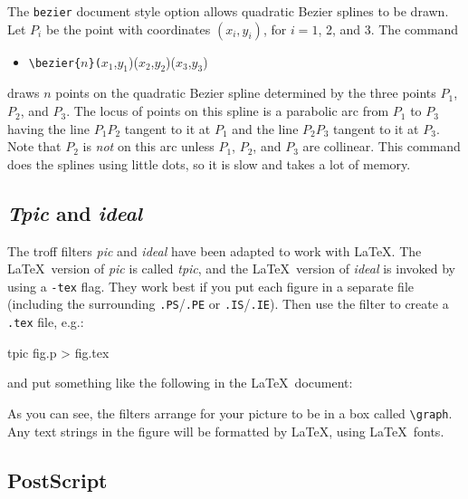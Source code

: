 The \verb|bezier| document style option allows quadratic Bezier
splines to be drawn.
Let $P_{i}$ be the point
with coordinates $(x_{i},y_{i})$, for $i=1$, 2, and 3.  The command
\begin{itemize} \tt
\item[]
\verb|\bezier{|$n$\verb|}(|$x_{1}$,$y_{1}$)($x_{2}$,$y_{2}$)($x_{3}$,$y_{3}$)
\end{itemize}
draws $n$ points on the quadratic Bezier spline determined by the three
points $P_{1}$, $P_{2}$, and $P_{3}$.  The locus of points on this
spline is a parabolic arc from $P_{1}$ to $P_{3}$ having the line
$P_{1}P_{2}$ tangent to it at $P_{1}$ and the line $P_{2}P_{3}$ tangent
to it at $P_{3}$.  Note that $P_{2}$ is {\em not\/} on this arc unless
$P_{1}$, $P_{2}$, and $P_{3}$ are collinear.
This command does the splines using little dots, so it is slow and
takes a lot of memory.

\subsection{{\em Tpic\/} and {\em ideal\/}}

The troff filters {\em pic\/} and {\em ideal\/} have
been adapted to work with \LaTeX.
The \LaTeX\ version of {\em pic\/} is called {\em tpic},
and the \LaTeX\ version of {\em ideal\/} is invoked by
using a \verb|-tex| flag.
They work best if you put each figure in a separate file
(including the surrounding \verb|.PS|/\verb|.PE| or \verb|.IS|/\verb|.IE|).
Then use the filter to create a \verb|.tex| file, e.g.:
\begin{eg}
tpic fig.p > fig.tex
\end{eg}
and put something like the following in the \LaTeX\ document:
\begin{eg}

\begin{center}
\mbox{\box\graph}
\end{center}
\end{eg}
As you can see, the filters arrange for your picture to be in
a box called \verb|\graph|.
Any text strings in the figure will be formatted by \LaTeX,
using \LaTeX\ fonts.

\subsection{PostScript}

